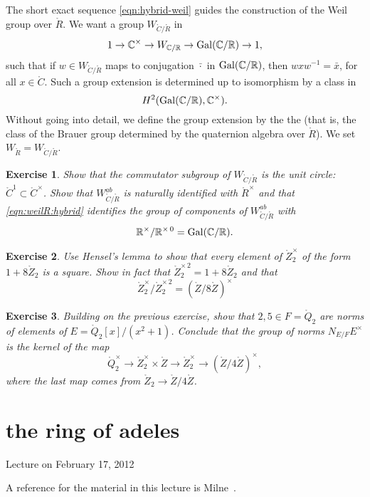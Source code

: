 \documentclass{amsart}
\newtheorem{exercise}{Exercise}
\def\CC{\ring{C}}
\def\RR{\ring{R}}
\def\ZZ{\ring{Z}}
\def\oG{\op{Gal}}
\begin{document}
The short exact sequence \eqref{eqn:hybrid-weil} guides the
construction of the Weil group over $\RR$.  We want a group
$W_{\CC/\RR}$ in
\begin{equation}\label{eqn:weilR:hybrid}
1 \to \CC^\times \to W_{\CC/\RR} \to \oG(\CC/\RR) \to 1,
\end{equation}
such that if $w\in W_{\CC/\RR}$ maps to conjugation $\bar \cdot$ in
$\oG(\CC/\RR)$, then $w x w^{-1} = \bar x$, for all $x\in\CC$.
Such a group extension is determined up to isomorphism by a class in
\[
H^2(\oG(\CC/\RR),\CC^\times).
\]
Without going into detail, we define the group extension by the the
 (that is, the class of the
Brauer group determined by the quaternion algebra over $\ring{R}$).
We set $W_\RR = W_{\CC/\RR}$.

\begin{exercise} Show that the commutator subgroup of $W_{\CC/\RR}$ is
 the unit circle:  $\CC^1\subset \CC^\times$.  Show that
  $W^{ab}_{\CC/\RR}$ is naturally identified with $\RR^\times$ and
  that \eqref{eqn:weilR:hybrid} identifies the group of components of
  $W^{ab}_{\CC/\RR}$ with
\[
\RR^\times/\RR^{\times\,0}=
\oG(\CC/\RR).
\]
\end{exercise}

\begin{exercise} Use Hensel's lemma to show that every element of
$\ring{Z}_2^\times$ of the form $1 + 8\ring{Z}_2$ is a square.  Show
in fact that $\ring{Z}_2^{\times\, 2}=1 + 8 \ring{Z}_2$ and that
\[
\ring{Z}_2^\times / \ring{Z}_2^{\times\, 2} = (\ring{Z}/8\ring{Z})^\times
\]
\end{exercise}

\begin{exercise}  Building on the previous exercise, show that $2, 5\in F=\ring{Q}_2$
are norms of elements of $E=\ring{Q}_2[x]/(x^2+1)$.  Conclude that the group
of norms $N_{E/F} E^\times$ is the kernel of the map
\[
\ring{Q}^\times _2 \to \ring{Z}^\times_2\times \ring{Z} \to 
\ring{Z}_2^\times \to (\ZZ/4\ZZ)^\times,
\]
where the last map comes from $\ring{Z}_2\to \ring{Z}/4\ring{Z}$.
\end{exercise}

\newpage
\section{the ring of adeles}

Lecture on February 17, 2012

A reference for the material in this lecture is Milne~\cite{CFT}.
\end{document}
